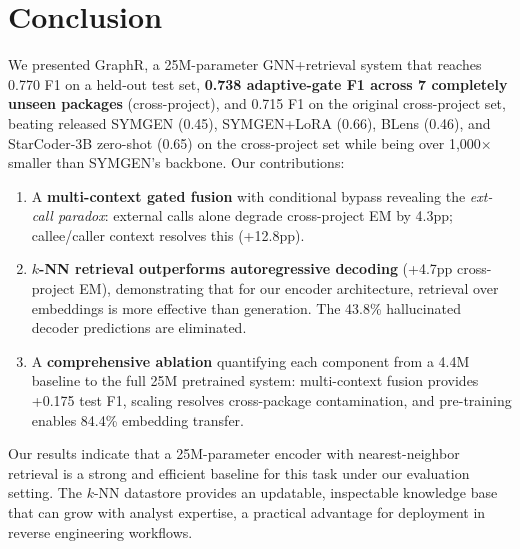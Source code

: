\documentclass[sigconf,nonacm]{acmart}
\newcommand{\sysname}{\textsf{GraphR}}
\begin{document}
\section{Conclusion}
\label{sec:conclusion}

We presented \sysname{}, a 25M-parameter GNN+retrieval system that reaches 0.770 F1 on a held-out test set, \textbf{0.738 adaptive-gate F1 across 7 completely unseen packages} (cross-project), and 0.715 F1 on the original cross-project set, beating released SYMGEN (0.45), SYMGEN+LoRA (0.66), BLens (0.46), and StarCoder-3B zero-shot (0.65) on the cross-project set while being over 1{,}000$\times$ smaller than SYMGEN's backbone. Our contributions:

\begin{enumerate}
    \item A \textbf{multi-context gated fusion} with conditional bypass revealing the \emph{ext-call paradox}: external calls alone degrade cross-project EM by 4.3pp; callee/caller context resolves this (+12.8pp).

    \item \textbf{$k$-NN retrieval outperforms autoregressive decoding} (+4.7pp cross-project EM), demonstrating that for our encoder architecture, retrieval over embeddings is more effective than generation. The 43.8\% hallucinated decoder predictions are eliminated.

    \item A \textbf{comprehensive ablation} quantifying each component from a 4.4M baseline to the full 25M pretrained system: multi-context fusion provides +0.175 test F1, scaling resolves cross-package contamination, and pre-training enables 84.4\% embedding transfer.
\end{enumerate}

Our results indicate that a 25M-parameter encoder with nearest-neighbor retrieval is a strong and efficient baseline for this task under our evaluation setting. The $k$-NN datastore provides an updatable, inspectable knowledge base that can grow with analyst expertise, a practical advantage for deployment in reverse engineering workflows.
\end{document}

